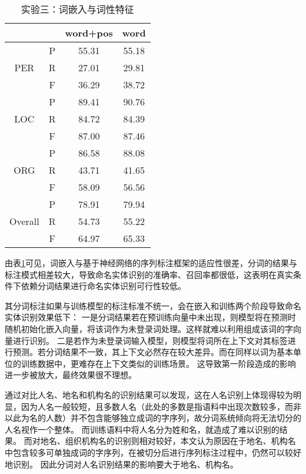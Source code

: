 \begin{table}[H]
    \centering
    \caption{实验三：词嵌入与词性特征}
    \begin{tabular}{cccc}
        \toprule
        & & word+pos & word\\
        \midrule
        \multirow{3}{*}{PER} & P & 55.31 & 55.18\\
        & R & 27.01 & 29.81\\
        & F & 36.29 & 38.72 \\
        \midrule
        \multirow{3}{*}{LOC} & P & 89.41 & 90.76\\
        & R & 84.72 & 84.39 \\
        & F & 87.00 & 87.46\\
        \midrule
        \multirow{3}{*}{ORG} & P & 86.58 & 88.08\\
        & R & 43.71 & 41.65\\
        & F & 58.09 & 56.56\\
        \midrule
        \multirow{3}{*}{Overall} & P & 78.91 & 79.94\\
        & R & 54.73 & 55.22\\
        & F & 64.97  & 65.33\\
        \bottomrule
    \end{tabular}
    \label{tab:word-comparison}
\end{table}

由表\ref{tab:word-comparison}可见，词嵌入与基于神经网络的序列标注框架的适应性很差，分词的结果与标注模式相差较大，导致命名实体识别的准确率、召回率都很低，这表明在真实条件下依赖分词结果进行命名实体识别可行性较低。

其分词标注如果与训练模型的标注标准不统一，会在嵌入和训练两个阶段导致命名实体识别效果低下：
一是分词结果若在预训练向量中未出现，则模型将在预测时随机初始化嵌入向量，将该词作为未登录词处理。这样就难以利用组成该词的字向量进行识别。
二是若作为未登录词输入模型，则模型将词所在上下文对其标签进行预测。若分词结果不一致，其上下文必然存在较大差异。而在同样以词为基本单位的训练数据中，更难存在上下文类似的训练场景。
这导致第一阶段造成的影响进一步被放大，最终效果很不理想。

通过对比人名、地名和机构名的识别结果可以发现，这在人名识别上体现得较为明显，因为人名一般较短，且多数人名（此处的多数是指语料中出现次数较多，而非以此为名的人数）并不包含能够独立成词的字序列，故分词系统倾向将无法切分的人名视作一个整体。
而训练语料中将人名分为姓和名，就造成了难以识别的结果。
而对地名、组织机构名的识别则相对较好，本文认为原因在于地名、机构名中包含较多可单独成词的字序列，在被切分后进行序列标注过程中，仍然可以较好地识别。
因此分词对人名识别结果的影响要大于地名、机构名。

